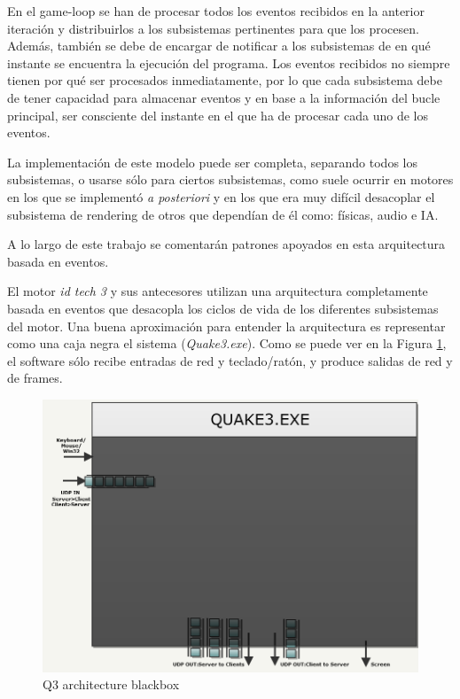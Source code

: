 \documentclass[a4paper,12pt]{report}
\begin{document}
\begin{itemize}
		En el game-loop se han de procesar todos los eventos recibidos en la anterior iteración y distribuirlos a los subsistemas pertinentes para que los procesen. Además, también se debe de encargar de notificar a los subsistemas de en qué instante se encuentra la ejecución del programa. Los eventos recibidos no siempre tienen por qué ser procesados inmediatamente, por lo que cada subsistema debe de tener capacidad para almacenar eventos y en base a la información del bucle principal, ser consciente del instante en el que ha de procesar cada uno de los eventos. 
		
		La implementación de este modelo puede ser completa, separando todos los subsistemas, o usarse sólo para ciertos subsistemas, como suele ocurrir en motores en los que se implementó \textit{a posteriori} y en los que era muy difícil desacoplar el subsistema de rendering de otros que dependían de él como: físicas, audio e IA. \cite{gameenginebook}
	
	    A lo largo de este trabajo se comentarán patrones apoyados en esta arquitectura basada en eventos.
		
	\end{itemize}	
	
	El motor \textit{id tech 3} y sus antecesores utilizan una arquitectura completamente basada en eventos que desacopla los ciclos de vida de los diferentes subsistemas del motor. Una buena aproximación para entender la arquitectura es representar como una caja negra el sistema (\textit{Quake3.exe}). Como se puede ver en la Figura \ref{figarchitectureblackbox}, el software sólo recibe entradas de red y teclado/ratón, y produce salidas de red y de frames.
	
	
	\begin{center}
		\begin{figure}[h]
			\includegraphics[width=1\textwidth]{images/q3_architecture_blackbox}
			\caption{Q3 architecture blackbox}
			\label{figarchitectureblackbox}
		\end{figure}
	\end{center}
\end{document}
